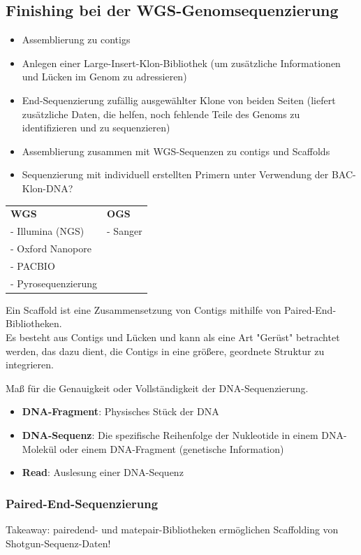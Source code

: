 \subsection{Finishing bei der WGS-Genomsequenzierung}  
\begin{itemize}
    \item Assemblierung zu \glspl{contig}
    \item Anlegen einer Large-Insert-Klon-Bibliothek (um zusätzliche Informationen und Lücken im Genom zu adressieren) 
    \item End-Sequenzierung zufällig ausgewählter Klone von beiden Seiten (liefert zusätzliche Daten, die helfen, noch fehlende Teile des Genoms zu identifizieren und zu sequenzieren)
    \item Assemblierung zusammen mit WGS-Sequenzen zu \glspl{contig} und \glspl{Scaffold} 
    \item Sequenzierung mit individuell erstellten Primern unter Verwendung der BAC-Klon-DNA?
\end{itemize}
\begin{mybox}[title=Welchen Ansatz nutzt welche Sequenzierungsmethdode?]
\begin{table}[H]
    \centering
    \begin{tabular}{p{7cm}p{7cm}}
       \textbf{WGS}  & \textbf{OGS}  \\
       - Illumina (NGS)  & - Sanger \\
       - Oxford Nanopore &  \\
       - PACBIO & \\
       - Pyrosequenzierung
    \end{tabular}
\end{table}
\end{mybox}

\begin{mechanism}[title=Definition Scaffolding] 
Ein Scaffold ist eine Zusammensetzung von Contigs mithilfe von Paired-End-Bibliotheken. \\ 
\noindent Es besteht aus Contigs und Lücken und kann als eine Art "Gerüst" betrachtet werden, das dazu dient, die Contigs in eine größere, geordnete Struktur zu integrieren. 
\end{mechanism}
\begin{mybox}[title=Definition Coverage] 
Maß für die Genauigkeit oder Vollständigkeit der DNA-Sequenzierung. 
\end{mybox}
\begin{mybox}[title=DNA-Fragment vs. DNA-Sequenz vs. Read ]
\begin{itemize}
    \item \textbf{DNA-Fragment}: Physisches Stück der DNA
    \item \textbf{DNA-Sequenz}: Die spezifische Reihenfolge der Nukleotide in einem DNA-Molekül oder einem DNA-Fragment (genetische Information)
    \item \textbf{Read}: Auslesung einer DNA-Sequenz
\end{itemize}
\end{mybox}
\subsubsection{Paired-End-Sequenzierung} 
Takeaway: \gls{pairedend}- und \gls{matepair}-Bibliotheken ermöglichen Scaffolding von Shotgun-Sequenz-Daten!
